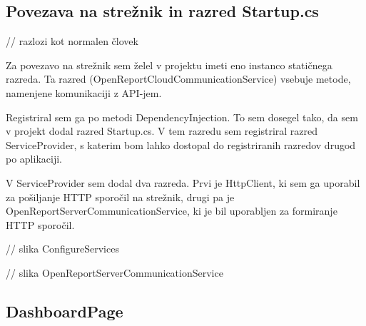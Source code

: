 \documentclass[a4paper, 12pt]{book}
\begin{document}
% 
% 
% 
% 
% 

\subsection{Povezava na strežnik in razred Startup.cs}

// razlozi kot normalen človek

Za povezavo na strežnik sem želel v projektu imeti eno instanco statičnega razreda.
Ta razred (OpenReportCloudCommunicationService) vsebuje metode, namenjene komunikaciji z API-jem.

Registriral sem ga po metodi DependencyInjection.
To sem dosegel tako, da sem v projekt dodal razred Startup.cs.
V tem razredu sem registriral razred ServiceProvider, s katerim bom lahko dostopal do registriranih razredov drugod po aplikaciji.

V ServiceProvider sem dodal dva razreda.
Prvi je HttpClient, ki sem ga uporabil za pošiljanje HTTP sporočil na strežnik, drugi pa je OpenReportServerCommunicationService, ki je bil uporabljen za formiranje HTTP sporočil.

// slika ConfigureServices

// slika OpenReportServerCommunicationService


\subsection{DashboardPage}
\end{document}
